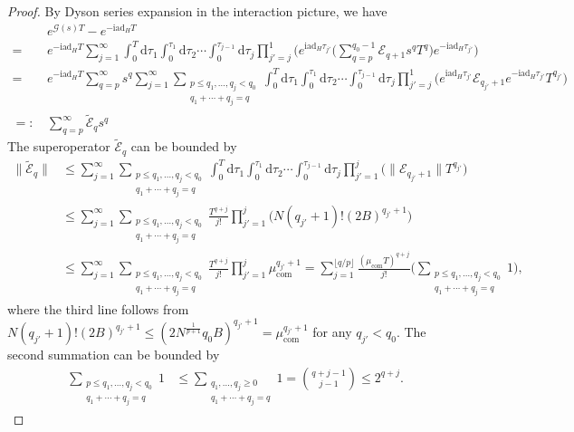 \documentclass[11pt]{article}
\renewcommand{\i}{\mathrm{i}}
\renewcommand{\d}{\mathrm{d}}
\newcommand{\ad}{\mathrm{ad}}
\newcommand{\B}{\Big}
\newcommand{\G}{\mathcal{G}}
\newcommand{\E}{\mathcal{E}}
\newcommand{\com}{\mathrm{com}}
\begin{document}
\begin{proof}
By Dyson series expansion in the interaction picture, we have 
\begin{align*}
    &e^{\G(s) T}-e^{-\i \ad_H T} \\
    = \ & e^{-\i \ad_H T}  \sum_{j=1}^{\infty} \int_{0}^T \d \tau_1 \int_{0}^{\tau_1}\d \tau_2 \cdots \int_{0}^{\tau_{j-1}}\d \tau_j \prod_{j'=j}^{1}\bigg(e^{\i\ad_H \tau_{j'}}\bigg(\sum_{q=p}^{q_0-1}\E_{q+1}s^qT^q\bigg)e^{-\i \ad_H \tau_{j'}}\bigg) \\
    = \ &  e^{-\i \ad_H T}\sum_{q = p}^{\infty}s^{q} \sum_{j=1}^{\infty} \sum_{\substack{p\le q_1,\ldots,q_j<q_0 \\ q_1+\cdots+q_j=q}} \int_{0}^T \d \tau_1 \int_{0}^{\tau_1}\d \tau_2 \cdots \int_{0}^{\tau_{j-1}}\d \tau_j \prod_{j'=j}^{1}\bigg(e^{\i\ad_H \tau_{j'}}\E_{q_{j'}+1}e^{-\i \ad_H \tau_{j'}}T^{q_{j'}}\bigg)\\
    =:\,& \sum_{q=p}^{\infty}\tilde{\E}_{q} s^q   
\end{align*}
The superoperator $\tilde{\E}_{q}$ can be bounded by \begin{align*}
    \big\|\tilde{\E}_{q}\big\|&\le \sum_{j=1}^{\infty} \sum_{\substack{p\le q_1,\ldots,q_j<q_0 \\ q_1+\cdots+q_j=q}} \int_{0}^T \d \tau_1 \int_{0}^{\tau_1}\d \tau_2 \cdots \int_{0}^{\tau_{j-1}}\d \tau_j \prod_{j'=1}^{j}\big(\big\|\E_{q_{j'}+1}\big\|T^{q_{j'}}\big) \\
    &\le  \sum_{j=1}^{\infty} \sum_{\substack{p\le q_1,\ldots,q_j<q_0 \\ q_1+\cdots+q_j=q}}\frac{T^{q+j}}{j!}\prod_{j'=1}^{j}\big(N(q_{j'}+1)!(2B)^{q_{j'}+1}\big) \\
    &\le \sum_{j=1}^{\infty} \sum_{\substack{p\le q_1,\ldots,q_j<q_0 \\ q_1+\cdots+q_j=q}}\frac{T^{q+j}}{j!}\prod_{j'=1}^{j} \mu_{\com}^{q_{j'}+1} = \sum_{j=1}^{\lfloor q/p\rfloor }\frac{(\mu_{\com}T)^{q+j}}{j!}\B( \sum_{\substack{p\le q_1,\ldots,q_j<q_0 \\ q_1+\cdots+q_j=q}} 1\B),
\end{align*}
where the third line follows from $N(q_{j'}+1)!(2B)^{q_{j'}+1} \le (2N^{\frac{1}{p+1}}q_0B)^{q_{j'}+1}=\mu_{\com}^{q_{j'}+1}$ for any $q_{j'} < q_0$.
The second summation can be bounded by \begin{align*}
    \sum_{\substack{p\le q_1,\ldots,q_j<q_0 \\ q_1+\cdots+q_j=q}} 1 &\le \sum_{\substack{ q_1,\ldots,q_j \ge 0 \\ q_1+\cdots+q_j=q}} 1=\binom{q+j-1}{j-1} \le 2^{q+j}.

\end{align*}
\end{proof}
\end{document}
